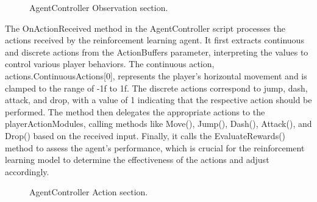 \documentclass[12pt,oneside,openright,a4paper]{cpe-english-project}
\begin{document}
 \begin{figure}[!h]
 \centering
\caption{AgentController Observation section.}\label{fig:observe}
\end{figure}
\newpage
The OnActionReceived method in the AgentController script processes the actions received by the reinforcement learning agent. It first extracts continuous and discrete actions from the ActionBuffers parameter, interpreting the values to control various player behaviors. The continuous action, actions.ContinuousActions[0], represents the player's horizontal movement and is clamped to the range of -1f to 1f. The discrete actions correspond to jump, dash, attack, and drop, with a value of 1 indicating that the respective action should be performed. The method then delegates the appropriate actions to the playerActionModules, calling methods like Move(), Jump(), Dash(), Attack(), and Drop() based on the received input. Finally, it calls the EvaluateRewards() method to assess the agent's performance, which is crucial for the reinforcement learning model to determine the effectiveness of the actions and adjust accordingly.\par
 \begin{figure}[!h]
 \centering
\caption{AgentController Action section.}\label{fig:action}
\end{figure}
\end{document}
